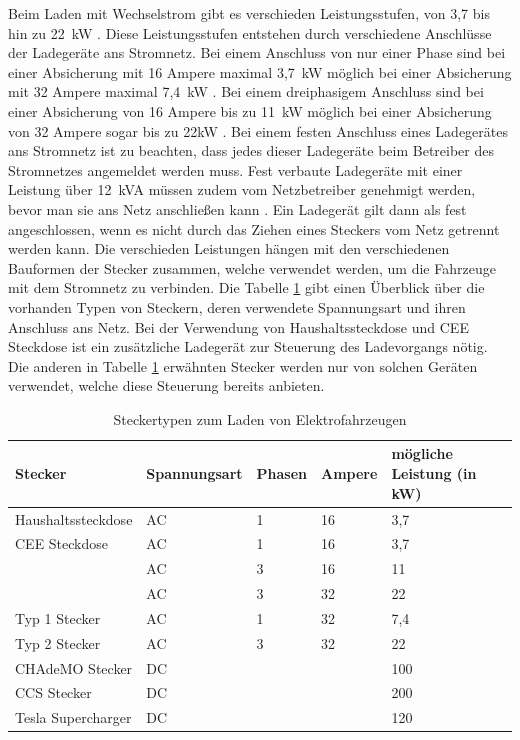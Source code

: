 Beim Laden mit Wechselstrom gibt es verschieden Leistungsstufen, von 3,7 bis hin zu 22~kW \cite{laden_1}. Diese Leistungsstufen entstehen durch verschiedene Anschlüsse der Ladegeräte ans Stromnetz. Bei einem Anschluss von nur einer Phase sind bei einer Absicherung mit 16 Ampere maximal 3,7~kW möglich bei einer Absicherung mit 32 Ampere maximal 7,4~kW \cite{laden_1}. Bei einem dreiphasigem Anschluss sind bei einer Absicherung von 16 Ampere bis zu 11~kW möglich bei einer Absicherung von 32 Ampere sogar bis zu 22kW \cite{laden_1}. Bei einem festen Anschluss eines Ladegerätes ans Stromnetz ist zu beachten, dass jedes dieser Ladegeräte beim Betreiber des Stromnetzes angemeldet werden muss. Fest verbaute Ladegeräte mit einer Leistung über 12~kVA müssen zudem vom Netzbetreiber genehmigt werden, bevor man sie ans Netz anschließen kann \cite{Lader_anschluss}. Ein Ladegerät gilt dann als fest angeschlossen, wenn es nicht durch das Ziehen eines Steckers vom Netz getrennt werden kann. Die verschieden Leistungen hängen mit den verschiedenen Bauformen der Stecker zusammen, welche verwendet werden, um die Fahrzeuge mit dem Stromnetz zu verbinden. Die Tabelle \ref{tab:table1} gibt einen Überblick über die vorhanden Typen von Steckern, deren verwendete Spannungsart und ihren Anschluss ans Netz. Bei der Verwendung von Haushaltssteckdose und CEE Steckdose ist ein zusätzliche Ladegerät zur Steuerung des Ladevorgangs nötig. Die anderen in Tabelle \ref{tab:table1} erwähnten Stecker werden nur von solchen Geräten verwendet, welche diese Steuerung bereits anbieten.
\begin{table}[bh]
\begin{tabular}{|l|l|l|l|l|}
\hline
Stecker            & Spannungsart & Phasen & Ampere & mögliche Leistung (in kW) \\ \hline \hline
Haushaltssteckdose & AC           & 1      & 16     & 3,7                       \\ \hline
CEE Steckdose      & AC           & 1      & 16     & 3,7                       \\ \cline{2-5} 
                   & AC           & 3      & 16     & 11                        \\ \cline{2-5} 
                   & AC           & 3      & 32     & 22                        \\ \hline
Typ 1 Stecker      & AC           & 1      & 32     & 7,4                       \\ \hline
Typ 2 Stecker      & AC           & 3      & 32     & 22                        \\ \hline
CHAdeMO Stecker    & DC           &        &        & 100                       \\ \hline
CCS Stecker        & DC           &        &        & 200                       \\ \hline
Tesla Supercharger & DC           &        &        & 120                       \\ \hline
\end{tabular}
\caption{Steckertypen zum Laden von Elektrofahrzeugen \cite{laden_1}}
\label{tab:table1}
\end{table}



